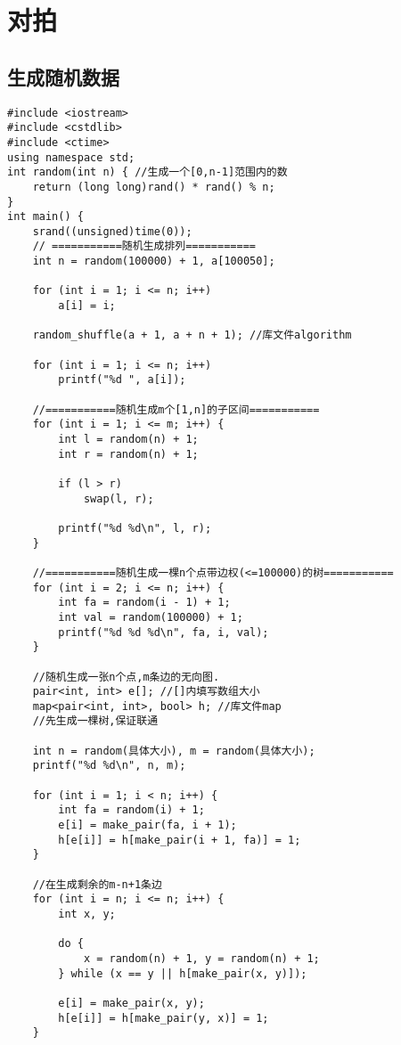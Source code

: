 \section{对拍}

\subsection{生成随机数据}

\begin{verbatim}
#include <iostream>
#include <cstdlib>
#include <ctime>
using namespace std;
int random(int n) { //生成一个[0,n-1]范围内的数
    return (long long)rand() * rand() % n;
}
int main() {
    srand((unsigned)time(0));
    // ===========随机生成排列===========
    int n = random(100000) + 1, a[100050];

    for (int i = 1; i <= n; i++)
        a[i] = i;

    random_shuffle(a + 1, a + n + 1); //库文件algorithm

    for (int i = 1; i <= n; i++)
        printf("%d ", a[i]);

    //===========随机生成m个[1,n]的子区间===========
    for (int i = 1; i <= m; i++) {
        int l = random(n) + 1;
        int r = random(n) + 1;

        if (l > r)
            swap(l, r);

        printf("%d %d\n", l, r);
    }

    //===========随机生成一棵n个点带边权(<=100000)的树===========
    for (int i = 2; i <= n; i++) {
        int fa = random(i - 1) + 1;
        int val = random(100000) + 1;
        printf("%d %d %d\n", fa, i, val);
    }

    //随机生成一张n个点,m条边的无向图.
    pair<int, int> e[]; //[]内填写数组大小
    map<pair<int, int>, bool> h; //库文件map
    //先生成一棵树,保证联通

    int n = random(具体大小), m = random(具体大小);
    printf("%d %d\n", n, m);

    for (int i = 1; i < n; i++) {
        int fa = random(i) + 1;
        e[i] = make_pair(fa, i + 1);
        h[e[i]] = h[make_pair(i + 1, fa)] = 1;
    }

    //在生成剩余的m-n+1条边
    for (int i = n; i <= n; i++) {
        int x, y;

        do {
            x = random(n) + 1, y = random(n) + 1;
        } while (x == y || h[make_pair(x, y)]);

        e[i] = make_pair(x, y);
        h[e[i]] = h[make_pair(y, x)] = 1;
    }


\end{verbatim}
